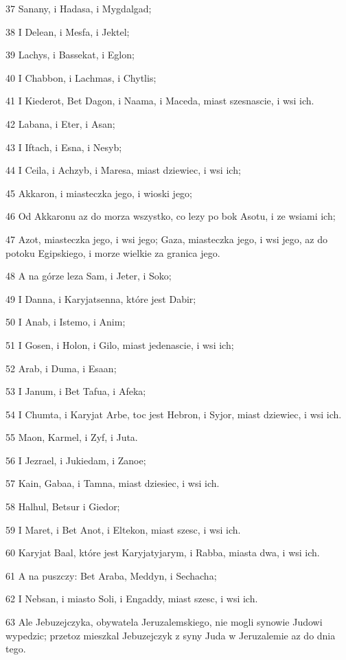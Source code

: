\par 37 Sanany, i Hadasa, i Mygdalgad;
\par 38 I Delean, i Mesfa, i Jektel;
\par 39 Lachys, i Bassekat, i Eglon;
\par 40 I Chabbon, i Lachmas, i Chytlis;
\par 41 I Kiederot, Bet Dagon, i Naama, i Maceda, miast szesnascie, i wsi ich.
\par 42 Labana, i Eter, i Asan;
\par 43 I Iftach, i Esna, i Nesyb;
\par 44 I Ceila, i Achzyb, i Maresa, miast dziewiec, i wsi ich;
\par 45 Akkaron, i miasteczka jego, i wioski jego;
\par 46 Od Akkaronu az do morza wszystko, co lezy po bok Asotu, i ze wsiami ich;
\par 47 Azot, miasteczka jego, i wsi jego; Gaza, miasteczka jego, i wsi jego, az do potoku Egipskiego, i morze wielkie za granica jego.
\par 48 A na górze leza Sam, i Jeter, i Soko;
\par 49 I Danna, i Karyjatsenna, które jest Dabir;
\par 50 I Anab, i Istemo, i Anim;
\par 51 I Gosen, i Holon, i Gilo, miast jedenascie, i wsi ich;
\par 52 Arab, i Duma, i Esaan;
\par 53 I Janum, i Bet Tafua, i Afeka;
\par 54 I Chumta, i Karyjat Arbe, toc jest Hebron, i Syjor, miast dziewiec, i wsi ich.
\par 55 Maon, Karmel, i Zyf, i Juta.
\par 56 I Jezrael, i Jukiedam, i Zanoe;
\par 57 Kain, Gabaa, i Tamna, miast dziesiec, i wsi ich.
\par 58 Halhul, Betsur i Giedor;
\par 59 I Maret, i Bet Anot, i Eltekon, miast szesc, i wsi ich.
\par 60 Karyjat Baal, które jest Karyjatyjarym, i Rabba, miasta dwa, i wsi ich.
\par 61 A na puszczy: Bet Araba, Meddyn, i Sechacha;
\par 62 I Nebsan, i miasto Soli, i Engaddy, miast szesc, i wsi ich.
\par 63 Ale Jebuzejczyka, obywatela Jeruzalemskiego, nie mogli synowie Judowi wypedzic; przetoz mieszkal Jebuzejczyk z syny Juda w Jeruzalemie az do dnia tego.


